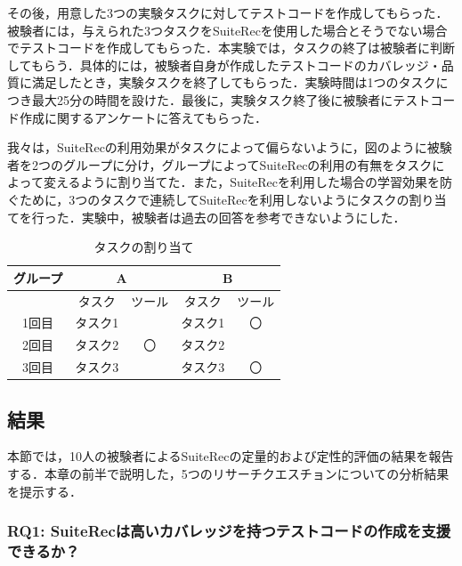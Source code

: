 \documentclass[12pt]{jarticle} %
\begin{document}
その後，用意した3つの実験タスクに対してテストコードを作成してもらった．被験者には，与えられた3つタスクを{\sf SuiteRec}を使用した場合とそうでない場合でテストコードを作成してもらった．本実験では，タスクの終了は被験者に判断してもらう．具体的には，被験者自身が作成したテストコードのカバレッジ・品質に満足したとき，実験タスクを終了してもらった．実験時間は1つのタスクにつき最大25分の時間を設けた．最後に，実験タスク終了後に被験者にテストコード作成に関するアンケートに答えてもらった．

我々は，SuiteRecの利用効果がタスクによって偏らないように，図のように被験者を2つのグループに分け，グループによってSuiteRecの利用の有無をタスクによって変えるように割り当てた．また，SuiteRecを利用した場合の学習効果を防ぐために，3つのタスクで連続してSuiteRecを利用しないようにタスクの割り当てを行った．実験中，被験者は過去の回答を参考できないようにした．


\begin{table}[]
\caption{タスクの割り当て}
\begin{center}
\begin{tabular}{|c|l|l|l|c|}
\hline
グループ & \multicolumn{2}{c|}{A}                              & \multicolumn{2}{c|}{B}                           \\ \hline
     & \multicolumn{1}{c|}{タスク} & \multicolumn{1}{c|}{ツール} & \multicolumn{1}{c|}{タスク} & ツール                   \\ \hline
1回目  & タスク1                     &                          & タスク1                     & 〇                     \\ \hline
2回目  & タスク2                     & \multicolumn{1}{c|}{〇}   & タスク2                     & \multicolumn{1}{l|}{} \\ \hline
3回目  & タスク3                     &                          & タスク3                     & 〇                     \\ \hline
\end{tabular}
\end{center}
\end{table}

\subsection{結果}
本節では，10人の被験者によるSuiteRecの定量的および定性的評価の結果を報告する．本章の前半で説明した，5つのリサーチクエスチョンについての分析結果を提示する．

\subsubsection{RQ1: {\sf SuiteRec}は高いカバレッジを持つテストコードの作成を支援できるか？}
\end{document}
